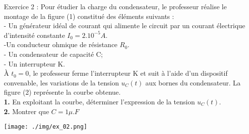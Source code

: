 \documentclass[12pt, french]{article}
\begin{document}


   \begin{Box2}{Exercice 2 : }
	   Pour étudier la charge du
condensateur, le professeur réalise le
montage de la figure (1) constitué des
éléments suivants :
\\- Un générateur idéal de courant
qui alimente le circuit par un
courant électrique d'intensité
constante $I_0 = 2.10^{-5}A$.
\\-Un conducteur ohmique de résistance $R_0$.
\\- Un condensateur de capacité C;
\\- Un interrupteur K.
\\À $t_0 =0$, le professeur ferme l'interrupteur K et suit à l'aide d'un dispositif convenable, les variations
de la tension $u_C(t)$ aux bornes du condensateur. La figure (2) représente la courbe obtenue.
\\\textbf{1. }En exploitant la courbe, déterminer l'expression de la tension $u_C(t)$.
\\\textbf{2. }Montrer que $C=1\mu.F$
  
\begin{center}
	\texttt{[image: ./img/ex\_02.png]}
  \end{center}




   \end{Box2}
\end{document}

